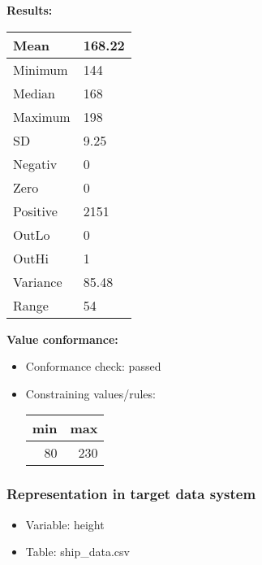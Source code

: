 \documentclass[
]{article}
\providecommand{\tightlist}{%
  \setlength{\itemsep}{0pt}\setlength{\parskip}{0pt}}
\begin{document}
\textbf{Results:}\\

\begin{table}[H]
\centering
\begin{tabular}{l|l}
\hline
Mean & 168.22\\
\hline
Minimum & 144\\
\hline
Median & 168\\
\hline
Maximum & 198\\
\hline
SD & 9.25\\
\hline
Negativ & 0\\
\hline
Zero & 0\\
\hline
Positive & 2151\\
\hline
OutLo & 0\\
\hline
OutHi & 1\\
\hline
Variance & 85.48\\
\hline
Range & 54\\
\hline
\end{tabular}
\end{table}

\textbf{Value conformance:}

\begin{itemize}
\tightlist
\item
  Conformance check: passed
\item
  Constraining values/rules:

  \begin{table}[H]
  \centering
  \begin{tabular}{r|r}
  \hline
  \textbf{min} & \textbf{max}\\
  \hline
  80 & 230\\
  \hline
  \end{tabular}
  \end{table}
\end{itemize}

\newpage

\hypertarget{representation-in-target-data-system-13}{%
\subsubsection{\texorpdfstring{Representation in \textbf{target} data
system}{Representation in target data system}}\label{representation-in-target-data-system-13}}

\begin{itemize}
\tightlist
\item
  Variable: height
\item
  Table: ship\_data.csv
\end{itemize}
\end{document}
